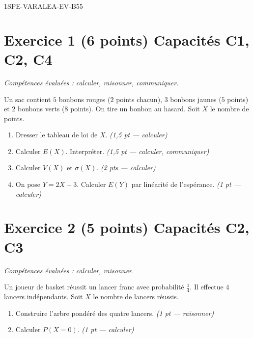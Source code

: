 \begin{evaluation}{1SPE-VARALEA-EV-B}{55}

\section*{Exercice 1 \hfill (6 points) \hfill Capacités C1, C2, C4}

\textit{Compétences évaluées : calculer, raisonner, communiquer.}

\medskip
Un sac contient $5$ bonbons rouges ($2$ points chacun), $3$ bonbons jaunes ($5$ points) et $2$ bonbons verts ($8$ points). On tire un bonbon au hasard. Soit $X$ le nombre de points.

\begin{enumerate}
  \item Dresser le tableau de loi de $X$.
  \hfill\textit{(1{,}5 pt — calculer)}

  \item Calculer $E(X)$. Interpréter.
  \hfill\textit{(1{,}5 pt — calculer, communiquer)}

  \item Calculer $V(X)$ et $\sigma(X)$.
  \hfill\textit{(2 pts — calculer)}

  \item On pose $Y = 2X - 3$. Calculer $E(Y)$ par linéarité de l'espérance.
  \hfill\textit{(1 pt — calculer)}
\end{enumerate}

\section*{Exercice 2 \hfill (5 points) \hfill Capacités C2, C3}

\textit{Compétences évaluées : calculer, raisonner.}

\medskip
Un joueur de basket réussit un lancer franc avec probabilité $\frac{1}{4}$. Il effectue $4$ lancers indépendants. Soit $X$ le nombre de lancers réussis.

\begin{enumerate}
  \item Construire l'arbre pondéré des quatre lancers.
  \hfill\textit{(1 pt — raisonner)}

  \item Calculer $P(X = 0)$.
  \hfill\textit{(1 pt — calculer)}


\end{enumerate}
\end{evaluation}

